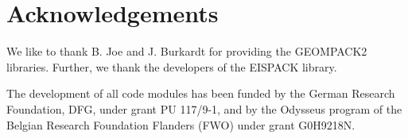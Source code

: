 \documentclass[10pt,a4paper]{article}
\begin{document}
\section{Acknowledgements}
We like to thank B. Joe and J. Burkardt for providing the GEOMPACK2 libraries.
Further, we thank the developers of the EISPACK library.

The development of all code modules has been funded by the German
Research Foundation, DFG, under grant PU 117/9-1, and by the Odysseus
program of the Belgian Research Foundation Flanders (FWO) under grant
G0H9218N.








\end{document}
